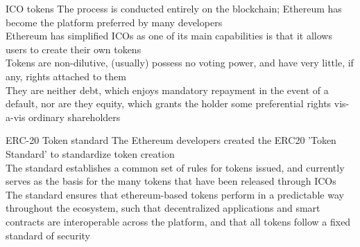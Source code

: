 \documentclass[9pt]{beamer}
\begin{document}

\begin{frame}{ICO tokens}
	The process is conducted entirely on the blockchain; Ethereum has become the platform preferred by many developers\\ \vspace{3mm}
	Ethereum has simplified ICOs as one of its main capabilities is that it allows users to create their own tokens\\ \vspace{3mm}
	Tokens are non-dilutive, (usually) possess no voting power, and have very little, if any, rights attached to them \\ \vspace{3mm}
	They are neither debt, which enjoys mandatory repayment in the event of a default, nor are they equity, which grants the holder some preferential rights vis-a-vis ordinary shareholders
\end{frame}


\begin{frame}{ERC-20 Token standard}
	The Ethereum developers created the ERC20 'Token Standard' to standardize token creation\\ \vspace{3mm}
	The standard establishes a common set of rules for tokens issued, and currently serves as the basis for the many tokens that have been released through ICOs \\ \vspace{3mm}
	The standard ensures that ethereum-based tokens perform in a predictable way throughout the ecosystem, such that decentralized applications and smart contracts are interoperable across the platform, and that all tokens follow a fixed standard of security
\end{frame}

\end{document}
